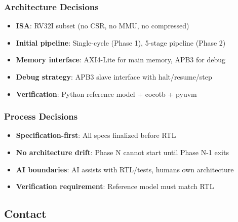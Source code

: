 \subsubsection{Architecture Decisions}\label{cr:status:phase-status:architecture-decisions}

\begin{record}

\begin{itemize}
\tightlist
\item
  \textbf{ISA}: RV32I subset (no CSR, no MMU, no compressed)
\item
  \textbf{Initial pipeline}: Single-cycle (Phase 1), 5-stage pipeline
  (Phase 2)
\item
  \textbf{Memory interface}: AXI4-Lite for main memory, APB3 for debug
\item
  \textbf{Debug strategy}: APB3 slave interface with
  halt/\allowbreak{}resume/\allowbreak{}step
\item
  \textbf{Verification}: Python reference model + cocotb + pyuvm
\end{itemize}

\end{record}

\subsubsection{Process Decisions}\label{cr:status:phase-status:process-decisions}

\begin{record}

\begin{itemize}
\tightlist
\item
  \textbf{Specification-first}: All specs finalized before RTL
\item
  \textbf{No architecture drift}: Phase N cannot start until Phase N-1
  exits
\item
  \textbf{AI boundaries}: AI assists with RTL/\allowbreak{}tests, humans
  own architecture
\item
  \textbf{Verification requirement}: Reference model must match RTL
\end{itemize}

\end{record}

\subsection{Contact}\label{cr:status:phase-status:contact}

